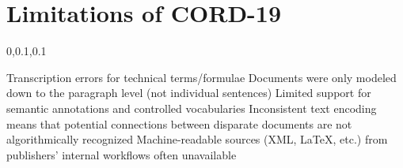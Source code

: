 
\section{Limitations of CORD-19}\fbeg{}\begin{frame}{}

\vspace{-.5em}	

{\Large{}\selectfont

\hspace*{20pt}\begin{minipage}{.96\textwidth}
\vspace{4pt}
		
\begin{lightquadblockc}{0,0.1,0.1}{\parbox{21cm}{\centering \vspace{3pt}}}
\begin{center}\begin{minipage}{1.1\textwidth}
{\Huge \setlength{\leftmargini}{30pt}\begin{enumerate}
\dmitem {\dsp} Transcription errors for technical terms/formulae 
\vspace{20pt}
\dmitem {\dsp} Documents were only modeled down to the paragraph level (not 
individual sentences)
\vspace{20pt}
\dmitem {\dsp} Limited support for semantic annotations and controlled vocabularies 
\vspace{20pt}
\dmitem {\dsp} Inconsistent text encoding means that potential connections 
between disparate documents are not algorithmically recognized
\vspace{20pt}
\dmitem {\dsp} Machine-readable sources (XML, \LaTeX{}, etc.) from publishers' 
internal workflows often unavailable
\end{enumerate}
}\end{minipage}
\end{center}
\end{lightquadblockc}
\end{minipage}

}

\end{frame}

